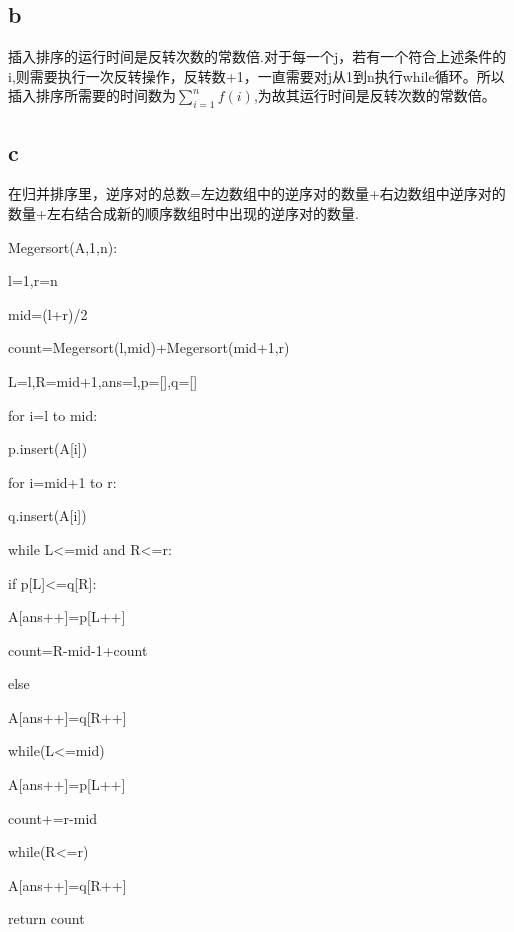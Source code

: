 \documentclass[12pt,a4paper]{article}
\begin{document}
    \subsection{b}插入排序的运行时间是反转次数的常数倍.对于每一个j，若有一个符合上述条件的i,则需要执行一次反转操作，反转数+1，一直需要对j从1到n执行while循环。所以插入排序所需要的时间数为$\sum_{i=1}^n f(i)$,为故其运行时间是反转次数的常数倍。
\subsection{c}
在归并排序里，逆序对的总数=左边数组中的逆序对的数量+右边数组中逆序对的数量+左右结合成新的顺序数组时中出现的逆序对的数量.
\par
Megersort(A,1,n):
\par\setlength\parindent{2em}l=1,r=n
\par\setlength\parindent{2em}mid=(l+r)/2
\par\setlength\parindent{2em}count=Megersort(l,mid)+Megersort(mid+1,r)
\par\setlength\parindent{2em}L=l,R=mid+1,ans=l,p=[],q=[]
\par\setlength\parindent{2em}for i=l to mid:
\par\setlength\parindent{4em}p.insert(A[i])
\par\setlength\parindent{2em}for i=mid+1 to r:
\par\setlength\parindent{4em}q.insert(A[i])
\par\setlength\parindent{2em}while L<=mid and R<=r:
\par\setlength\parindent{4em}if p[L]<=q[R]:
\par\setlength\parindent{6em}A[ans++]=p[L++]
\par\setlength\parindent{6em}count=R-mid-1+count
\par\setlength\parindent{4em}else
\par\setlength\parindent{6em}A[ans++]=q[R++]
\par\setlength\parindent{2em}while(L<=mid)
\par\setlength\parindent{4em}A[ans++]=p[L++]
\par\setlength\parindent{4em}count+=r-mid
\par\setlength\parindent{2em}while(R<=r)
\par\setlength\parindent{4em}A[ans++]=q[R++]
\par\setlength\parindent{2em}return count
\end{document}
